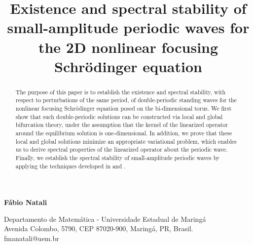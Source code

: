 \documentclass[12pt,reqno,a4paper]{amsart} %
\numberwithin{equation}{section}
\numberwithin{figure}{section}
\begin{document}
\vglue-1cm \hskip1cm
\title[existence and spectral stability for the 2D-NLS]{Existence and spectral stability of small-amplitude periodic waves for the 2D nonlinear focusing Schr\"odinger equation}




\begin{center}






\maketitle


{\bf F\'abio Natali}

{Departamento de Matem\'atica - Universidade Estadual de Maring\'a\\
Avenida Colombo, 5790, CEP 87020-900, Maring\'a, PR, Brasil.}\\
{ fmanatali@uem.br}






\vspace{3mm}




\end{center}

\begin{abstract} The purpose of this paper is to establish the existence and spectral stability, with respect to perturbations of the same period, of double-periodic standing waves for the nonlinear focusing Schrödinger equation posed on the bi-dimensional torus. We first show that such double-periodic solutions can be constructed via local and global bifurcation theory, under the assumption that the kernel of the linearized operator around the equilibrium solution is one-dimensional. In addition, we prove that these local and global solutions minimize an appropriate variational problem, which enables us to derive spectral properties of the linearized operator about the periodic wave. Finally, we establish the spectral stability of small-amplitude periodic waves by applying the techniques developed in \cite{KapitulaKevrekidisSandstedeII} and \cite{KapitulaKevrekidisSandstedeI}.
\end{abstract}
\end{document}
